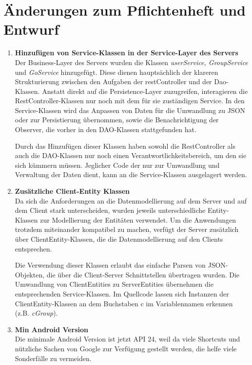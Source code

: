 \documentclass[11pt,a4paper]{scrartcl}
\begin{document}
\section{Änderungen zum Pflichtenheft und Entwurf}
\begin{enumerate}
	\item \textbf{Hinzufügen von Service-Klassen in der Service-Layer des Servers}\\
	Der Business-Layer des Servers wurden die Klassen \textit{userService, GroupService} und \textit{GoService} hinzugefügt. Diese dienen hauptsächlich der klareren Strukturierung zwischen den Aufgaben der restController und der Dao-Klassen. Anstatt direkt auf die Persistence-Layer zuzugreifen, interagieren die RestController-Klassen nur noch mit dem für sie zuständigen Service. In den Service-Klassen wird das Anpassen von Daten für die Umwandlung zu JSON oder zur Persistierung übernommen, sowie die Benachrichtigung der Observer, die vorher in den DAO-Klassen stattgefunden hat.
	
Durch das Hinzufügen dieser Klassen haben sowohl die RestController als auch die DAO-Klassen nur noch einen Verantwortlichkeitsbereich, um den sie sich kümmern müssen. Jeglicher Code der nur zur Umwandlung und Verwaltung der Daten dient, kann an die Service-Klassen ausgelagert werden.

	\item \textbf{Zusätzliche Client-Entity Klassen}\\
	Da sich die Anforderungen an die Datenmodellierung auf dem Server und auf dem Client stark unterscheiden, wurden jeweils unterschiedliche Entity-Klassen zur Modellierung der Entitäten verwendet. Um die Anwendungen trotzdem miteinander kompatibel zu machen, verfügt der Server zusätzlich über ClientEntity-Klassen, die die Datenmodellierung auf den Clients entsprechen.
	
	Die Verwendung dieser Klassen erlaubt das einfache Parsen von JSON-Objekten, die über die Client-Server Schnittstellen übertragen wurden. Die Umwandlung von ClientEntities zu ServerEntities übernehmen die entsprechenden Service-Klassen. Im Quellcode lassen sich Instanzen der ClientEntity-Klassen an dem Buchstaben c im Variablennamen erkennen (z.B. \textit{cGroup}).
	
	\item \textbf{Min Android Version} \\
	
	Die minimale Android Version ist jetzt API 24, weil da viele Shortcuts und nützliche Sachen von Google zur Verfügung gestellt werden, die helfe viele Sonderfälle zu vermeiden.	
	

\end{enumerate}
\end{document}
